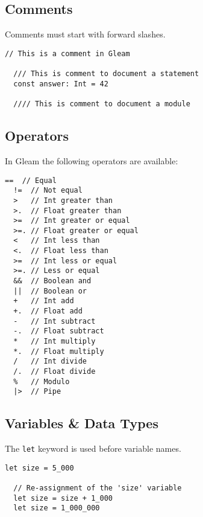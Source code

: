 \subsection*{\rmfamily Comments}

Comments must start with forward slashes.

\begin{lstlisting}[belowskip=-\baselineskip]
  // This is a comment in Gleam

  /// This is comment to document a statement
  const answer: Int = 42

  //// This is comment to document a module
\end{lstlisting}

\vs
\subsection*{\rmfamily Operators}

In Gleam the following operators are available:

\begin{lstlisting}[belowskip=-\baselineskip]
  ==  // Equal
  !=  // Not equal
  >   // Int greater than
  >.  // Float greater than
  >=  // Int greater or equal
  >=. // Float greater or equal
  <   // Int less than
  <.  // Float less than
  >=  // Int less or equal
  >=. // Less or equal
  &&  // Boolean and
  ||  // Boolean or	
  +   // Int add
  +.  // Float add
  -   // Int subtract
  -.  // Float subtract
  *   // Int multiply
  *.  // Float multiply
  /   // Int divide
  /.  // Float divide
  %   // Modulo	
  |>  // Pipe
\end{lstlisting}


\vs
\subsection*{\rmfamily Variables \& Data Types}

The \lstinline[language=Gleam, basicstyle=\small]!let! keyword is used 
before variable names.

\begin{lstlisting}[belowskip=-\baselineskip]
  let size = 5_000

  // Re-assignment of the 'size' variable
  let size = size + 1_000
  let size = 1_000_000
\end{lstlisting}

